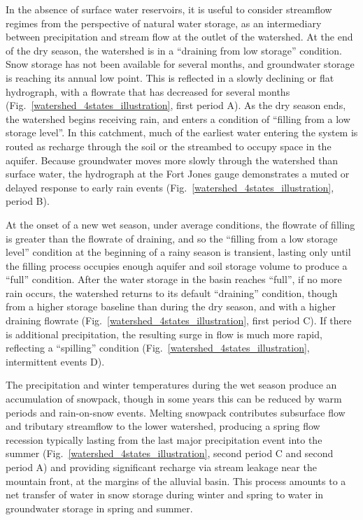 \documentclass[hess, manuscript]{copernicus}
\begin{document}
In the absence of surface water reservoirs, it is useful to consider
streamflow regimes from the perspective of natural water storage, as an
intermediary between precipitation and stream flow at the outlet of the
watershed. At the end of the dry season, the watershed is in a
``draining from low storage'' condition. Snow storage has not been
available for several months, and groundwater storage is reaching its
annual low point. This is reflected in a slowly declining or flat
hydrograph, with a flowrate that has decreased for several months
(Fig.~\ref{watershed_4states_illustration}, first period A). As the
dry season ends, the watershed begins receiving rain, and enters a
condition of ``filling from a low storage level''. In this catchment,
much of the earliest water entering the system is routed as recharge
through the soil or the streambed to occupy space in the aquifer.
Because groundwater moves more slowly through the watershed than surface
water, the hydrograph at the Fort Jones gauge demonstrates a muted or
delayed response to early rain events
(Fig.~\ref{watershed_4states_illustration}, period B).

At the onset of a new wet season, under average conditions, the flowrate
of filling is greater than the flowrate of draining, and so the
``filling from a low storage level'' condition at the beginning of a
rainy season is transient, lasting only until the filling process
occupies enough aquifer and soil storage volume to produce a ``full''
condition. After the water storage in the basin reaches ``full'', if no
more rain occurs, the watershed returns to its default ``draining''
condition, though from a higher storage baseline than during the dry
season, and with a higher draining flowrate
(Fig.~\ref{watershed_4states_illustration}, first period C). If there
is additional precipitation, the resulting surge in flow is much more
rapid, reflecting a ``spilling'' condition
(Fig.~\ref{watershed_4states_illustration}, intermittent events D).

The precipitation and winter temperatures during the wet season produce
an accumulation of snowpack, though in some years this can be reduced by
warm periods and rain-on-snow events. Melting snowpack contributes
subsurface flow and tributary streamflow to the lower watershed,
producing a spring flow recession typically lasting from the last major
precipitation event into the summer
(Fig.~\ref{watershed_4states_illustration}, second period C and
second period A) and providing significant recharge via stream leakage
near the mountain front, at the margins of the alluvial basin. This
process amounts to a net transfer of water in snow storage during winter
and spring to water in groundwater storage in spring and summer.
\end{document}
